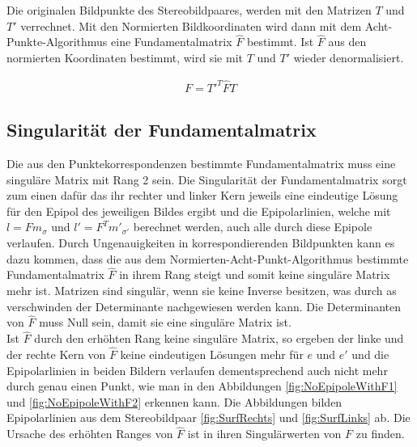 Die originalen Bildpunkte des Stereobildpaares, werden mit den Matrizen $T$ und $T'$ verrechnet. Mit den Normierten Bildkoordinaten wird dann mit dem Acht-Punkte-Algorithmus eine Fundamentalmatrix $\hat{F}$ bestimmt\cite{HZ,HZ8,Ferid,Brooks}. Ist $\hat{F}$ aus den normierten Koordinaten bestimmt, wird sie mit $T$ und $T'$ wieder denormalisiert.

\begin{gather}
	F = T'^T\hat{F}T
\end{gather}



\subsection{Singularität der Fundamentalmatrix}
\label{sec:SingularityOfF}

Die aus den Punktekorrespondenzen bestimmte Fundamentalmatrix muss eine singuläre Matrix mit Rang 2 sein\cite{HZ,ZZGXr,Ferid}. Die Singularität der Fundamentalmatrix sorgt zum einen dafür das ihr rechter und linker Kern jeweils eine eindeutige Lösung für den Epipol des jeweiligen Bildes ergibt und die Epipolarlinien, welche mit $l = Fm_\sigma$ und $l' = F^Tm'_{\sigma'}$ berechnet werden, auch alle durch diese Epipole verlaufen\cite{HZ}. Durch Ungenauigkeiten in korrespondierenden Bildpunkten kann es dazu kommen, dass die aus dem Normierten-Acht-Punkt-Algorithmus bestimmte Fundamentalmatrix $\hat{F}$ in ihrem Rang steigt und somit keine singuläre Matrix mehr ist. Matrizen sind singulär, wenn sie keine Inverse besitzen, was durch as verschwinden der Determinante nachgewiesen werden kann\cite{FormelsammlungMatrizen}. Die Determinanten von $\hat{F}$ muss Null sein, damit sie eine singuläre Matrix ist.\\

Ist $\hat{F}$ durch den erhöhten Rang keine singuläre Matrix, so ergeben der linke und der rechte Kern von $\hat{F}$ keine eindeutigen Lösungen mehr für $e$ und $e'$ und die Epipolarlinien in beiden Bildern verlaufen dementsprechend auch nicht mehr durch genau einen Punkt, wie man in den Abbildungen \ref{fig:NoEpipoleWithF1} und \ref{fig:NoEpipoleWithF2} erkennen kann. Die Abbildungen bilden Epipolarlinien aus dem Stereobildpaar \ref{fig:SurfRechts} und \ref{fig:SurfLinks} ab. Die Ursache des erhöhten Ranges von $\hat{F}$ ist in ihren Singulärwerten von $F$ zu finden.\\

\pagebreak
%
%
%

